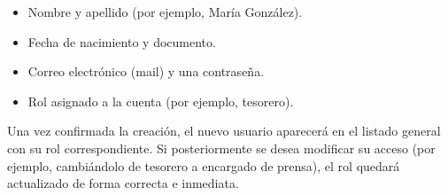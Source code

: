 \begin{itemize}
    \item Nombre y apellido (por ejemplo, María González).
    \item Fecha de nacimiento y documento.
    \item Correo electrónico (mail) y una contraseña.
    \item Rol asignado a la cuenta (por ejemplo, tesorero).
\end{itemize}

Una vez confirmada la creación, el nuevo usuario aparecerá en el listado general con su rol correspondiente. Si posteriormente se desea modificar su acceso (por ejemplo, cambiándolo de tesorero a encargado de prensa), el rol quedará actualizado de forma correcta e inmediata.
